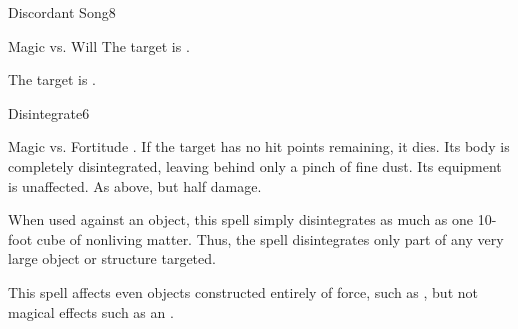 \begin{spellsection}{Discordant Song}{8}
\begin{spellheader}
\end{spellheader}
\begin{spellcontent}
    \begin{spelltargetinginfo}
    \end{spelltargetinginfo}
    \begin{spelleffects}
        \begin{spellattack}{Magic vs. Will}
            \spellsuccess The target is \disoriented.

            \spellcritical The target is \confused.
        \end{spellattack}
        \spelldur \durshort
    \end{spelleffects}
\end{spellcontent}
\begin{spellfooter}
\end{spellfooter}
\end{spellsection}

\begin{spellsection}{Disintegrate}{6}
\begin{spellheader}
\end{spellheader}
\begin{spellcontent}
    \begin{spelltargetinginfo}
    \end{spelltargetinginfo}
    \begin{spelleffects}
        \begin{spellattack}{Magic vs. Fortitude}
            \spellsuccess {}. If the target has no hit points remaining, it dies. Its body is completely disintegrated, leaving behind only a pinch of fine dust. Its equipment is unaffected.
            \spellfailure As above, but half damage.
        \end{spellattack}
        \spellspecial When used against an object, this spell simply disintegrates as much as one 10-foot cube of nonliving matter. Thus, the spell disintegrates only part of any very large object or structure targeted.
    \end{spelleffects}
\end{spellcontent}
\begin{spellfooter}
    \spellnotes This spell affects even objects constructed entirely of force, such as , but not magical effects such as an .
\end{spellfooter}
\end{spellsection}

